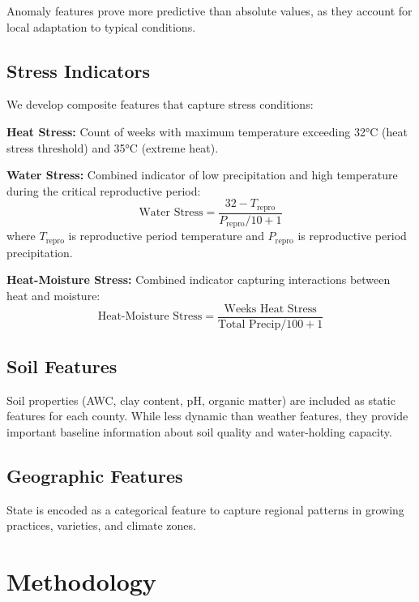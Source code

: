 \documentclass[conference]{IEEEtran}
\begin{document}
Anomaly features prove more predictive than absolute values, as they account for local adaptation to typical conditions.

\subsection{Stress Indicators}

We develop composite features that capture stress conditions:

\textbf{Heat Stress:} Count of weeks with maximum temperature exceeding 32°C (heat stress threshold) and 35°C (extreme heat).

\textbf{Water Stress:} Combined indicator of low precipitation and high temperature during the critical reproductive period:
\begin{equation}
\text{Water Stress} = \frac{32 - T_{\text{repro}}}{P_{\text{repro}}/10 + 1}
\end{equation}
where $T_{\text{repro}}$ is reproductive period temperature and $P_{\text{repro}}$ is reproductive period precipitation.

\textbf{Heat-Moisture Stress:} Combined indicator capturing interactions between heat and moisture:
\begin{equation}
\text{Heat-Moisture Stress} = \frac{\text{Weeks Heat Stress}}{\text{Total Precip}/100 + 1}
\end{equation}

\subsection{Soil Features}

Soil properties (AWC, clay content, pH, organic matter) are included as static features for each county. While less dynamic than weather features, they provide important baseline information about soil quality and water-holding capacity.

\subsection{Geographic Features}

State is encoded as a categorical feature to capture regional patterns in growing practices, varieties, and climate zones.

\section{Methodology}
\end{document}
